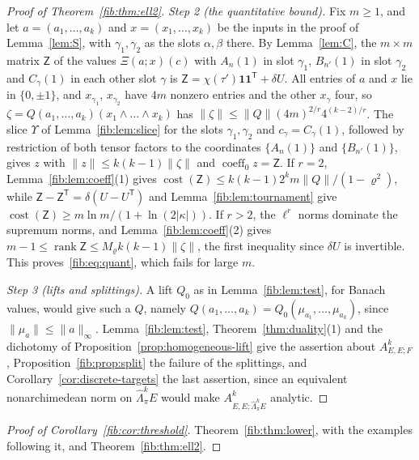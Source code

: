 \documentclass[11pt]{amsart}
\theoremstyle{definition}
\theoremstyle{remark}
\numberwithin{equation}{section}
\newcommand{\abs}[1]{\lvert #1\rvert}
\newcommand{\norm}[1]{\lVert #1\rVert}
\newcommand{\coeff}{\operatorname{coeff}}
\newcommand{\rank}{\operatorname{rank}}
\theoremstyle{plain}
\theoremstyle{definition}
\theoremstyle{plain}
\begin{document}
\begin{proof}[Proof of Theorem~\ref{fib:thm:ell2}]
\emph{Step 2 (the quantitative bound).} Fix $m\ge1$, and let $a=(a_1,\dots,a_k)$ and $x=(x_1,\dots,x_k)$ be the inputs in
the proof of Lemma~\ref{lem:S}, with $\gamma_1,\gamma_2$ as the slots $\alpha,\beta$ there. By Lemma~\ref{lem:C}, the
$m\times m$ matrix $\mathsf Z$ of the values $\Xi(a;x)(c)$ with $A_n(1)$ in slot $\gamma_1$, $B_{n'}(1)$ in slot
$\gamma_2$ and $C_\gamma(1)$ in each other slot $\gamma$ is $\mathsf Z=\chi(\tau')\mathbf 1\mathbf 1^{\mathsf T}+\delta U$.
All entries of $a$ and $x$ lie in $\{0,\pm1\}$, and $x_{\gamma_1}$, $x_{\gamma_2}$ have $4m$ nonzero entries and the
other $x_\gamma$ four, so $\zeta=Q(a_1,\dots,a_k)(x_1\wedge\dots\wedge x_k)$ has $\norm\zeta\le\norm Q(4m)^{2/r}4^{(k-2)/r}$.
The slice $\Upsilon$ of Lemma~\ref{fib:lem:slice} for the slots $\gamma_1,\gamma_2$ and $c_\gamma=C_\gamma(1)$, followed by
restriction of both tensor factors to the coordinates $\{A_n(1)\}$ and $\{B_{n'}(1)\}$, gives $z$ with
$\norm z\le k(k-1)\norm\zeta$ and $\coeff_0z=\mathsf Z$. If $r=2$, Lemma~\ref{fib:lem:coeff}(1) gives
$\operatorname{cost}(\mathsf Z)\le k(k-1)2^km\norm Q/(1-\varrho^2)$, while $\mathsf Z-\mathsf Z^{\mathsf T}=\delta(U-U^{\mathsf T})$
and Lemma~\ref{fib:lem:tournament} give $\operatorname{cost}(\mathsf Z)\ge m\ln m/(1+\ln(2\abs\kappa))$. If $r>2$, the
$\ell^r$ norms dominate the supremum norms, and Lemma~\ref{fib:lem:coeff}(2) gives
$m-1\le\rank\mathsf Z\le M_\varrho k(k-1)\norm\zeta$, the first inequality since $\delta U$ is invertible. This
proves~\eqref{fib:eq:quant}, which fails for large $m$.

\emph{Step 3 (lifts and splittings).} A lift $Q_0$ as in Lemma~\ref{fib:lem:test}, for Banach values, would give such a
$Q$, namely $Q(a_1,\dots,a_k)=Q_0(\mu_{a_1},\dots,\mu_{a_k})$, since $\norm{\mu_a}\le\norm a_\infty$.
Lemma~\ref{fib:lem:test}, Theorem~\ref{thm:duality}(1) and the dichotomy of Proposition~\ref{prop:homogeneous-lift} give
the assertion about $A^k_{E,E;F}$, Proposition~\ref{fib:prop:split} the failure of the splittings, and
Corollary~\ref{cor:discrete-targets} the last assertion, since an equivalent nonarchimedean norm on
$\widehat\Lambda^k_\pi E$ would make $A^k_{E,E;\widehat\Lambda^k_\pi E}$ analytic.
\end{proof}

\begin{proof}[Proof of Corollary~\ref{fib:cor:threshold}]
Theorem~\ref{fib:thm:lower}, with the examples following it, and Theorem~\ref{fib:thm:ell2}.
\end{proof}
\end{document}
